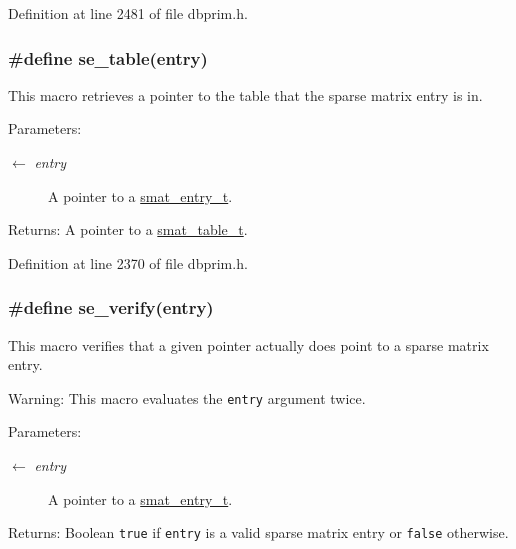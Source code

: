 Definition at line 2481 of file dbprim.h.\hypertarget{group__dbprim__smat_ga56}{
\subsubsection[se\_\-table]{\setlength{\rightskip}{0pt plus 5cm}\#define se\_\-table(entry)}}
\label{group__dbprim__smat_ga56}


This macro retrieves a pointer to the table that the sparse matrix entry is in.

\begin{Desc}
\item[Parameters:]
\begin{description}
\item[\mbox{$\leftarrow$} {\em entry}]A pointer to a \hyperlink{group__dbprim__smat_ga2}{smat\_\-entry\_\-t}.\end{description}
\end{Desc}
\begin{Desc}
\item[Returns:]A pointer to a \hyperlink{group__dbprim__smat_ga0}{smat\_\-table\_\-t}.\end{Desc}


Definition at line 2370 of file dbprim.h.\hypertarget{group__dbprim__smat_ga55}{
\subsubsection[se\_\-verify]{\setlength{\rightskip}{0pt plus 5cm}\#define se\_\-verify(entry)}}
\label{group__dbprim__smat_ga55}


This macro verifies that a given pointer actually does point to a sparse matrix entry.

\begin{Desc}
\item[Warning:]This macro evaluates the {\tt entry} argument twice.\end{Desc}
\begin{Desc}
\item[Parameters:]
\begin{description}
\item[\mbox{$\leftarrow$} {\em entry}]A pointer to a \hyperlink{group__dbprim__smat_ga2}{smat\_\-entry\_\-t}.\end{description}
\end{Desc}
\begin{Desc}
\item[Returns:]Boolean {\tt true} if {\tt entry} is a valid sparse matrix entry or {\tt false} otherwise.\end{Desc}


